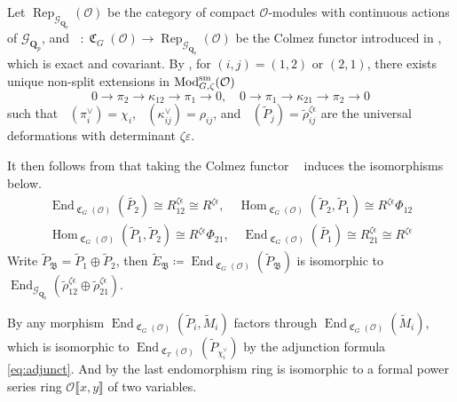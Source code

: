 \documentclass[leqno]{amsart}
\theoremstyle{definition}
\theoremstyle{remark}
\newcommand{\oo}{\mathcal{O}}
\newcommand{\Qp}{\mathbf{Q}_p}
\DeclareMathOperator{\End}{End}
\DeclareMathOperator{\Hom}{Hom}
\DeclareMathOperator{\Mod}{\textnormal{Mod}}
\DeclareMathOperator{\fC}{\mathfrak{C}} %
\DeclareMathOperator{\Rep}{Rep}
\DeclareMathOperator{\V}{\check{\mathbf{V}}} %
\newcommand{\Gp}{\mathcal{G}_{\Qp}} %
\newcommand{\B}{\mathfrak B} %
\newcommand{\sm}{\textnormal{sm}}
\begin{document}
Let $\Rep_{\Gp}(\oo)$
be the category of compact $\oo$-modules with
continuous actions of $\Gp$,
and $\V\colon \fC_G(\oo)\to \Rep_{\Gp}(\oo)$
be the Colmez functor introduced 
in \cite[\S 5.7]{pask},
which is exact and covariant.
By \cite[Cor 8.7]{pask},
for $(i,j)=(1,2)$ or  $(2,1)$,
there exists unique non-split extensions
in $\Mod^{\sm}_{G,\zeta}(\oo)$ 
\[
	0\to \pi_2\to \kappa_{12}\to \pi_1\to 0,\quad
	0\to \pi_1\to \kappa_{21}\to \pi_2\to 0
\]
such that
$\V(\pi_i^\vee)=\chi_i$, $\V(\kappa_{ij}^\vee)=\rho_{ij}$,
and $\V(\tilde{P}_j)=\tilde{\rho}^{\zeta\epsilon}_{ij}$
are the universal deformations
with determinant $\zeta\varepsilon$.

It then follows from \cite[Lem 8.10]{pask} that 
taking the Colmez functor 
$\V$ induces the isomorphisms below.
\begin{equation}\label{eq:end_deform}
\begin{split}
	\End_{\fC_{G}(\oo)}(\tilde{P_2})\cong 
    R^{\zeta\epsilon}_{12}\cong R^{\zeta\epsilon},\quad
	\Hom_{\fC_G(\oo)}(\tilde{P}_2, \tilde{P}_1)\cong
    R^{\zeta\epsilon}\Phi_{12}\\
	\Hom_{\fC_G(\oo)}(\tilde{P}_1, \tilde{P}_2)\cong
    R^{\zeta\epsilon}\Phi_{21},\quad
	\End_{\fC_{G}(\oo)}(\tilde{P_1})\cong 
    R^{\zeta\epsilon}_{21}\cong R^{\zeta\epsilon}
\end{split}
\end{equation}
Write $ \tilde{P}_\B=\tilde{P}_1\oplus \tilde{P}_2$,
then $\tilde{E}_\B\coloneqq
\End_{\fC_G(\oo)}(\tilde{P}_\B)$
is isomorphic to 
$\End_{\Gp}(\tilde{\rho}^{\zeta\epsilon}_{12}\oplus
\tilde{\rho}^{\zeta\epsilon}_{21})$.



By \cite[Prop 7.1]{pask}
any morphism 
$\End_{\fC_G(\oo)}(\tilde{P}_i, \tilde{M}_i)$
factors through
$\End_{\fC_G(\oo)}(\tilde{M}_i)$,
which is isomorphic to 
$ \End_{\fC_T(\oo)}(\tilde{P}_{\chi_i^\vee})$
by the adjunction formula \eqref{eq:adjunct}.
And by \cite[Prop 3.34]{pask}
the last endomorphism ring is isomorphic to 
a formal power series ring
$ \oo\llbracket x,y\rrbracket$
of two variables.
\end{document}
